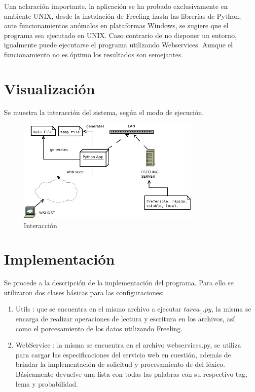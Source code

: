 \documentclass[12pt]{article}
\begin{document}
Una aclaración importante, la aplicación se ha probado exclusivamente en ambiente UNIX, desde la instalación de Freeling hasta las librerías de Python, ante funcionamientos anómalos en plataformas Windows, se sugiere que el programa sea ejecutado en UNIX.
Caso contrario de no disponer un entorno, igualmente puede ejecutarse el programa utilizando Webservices. Aunque el funcionamiento no es óptimo los resultados son semejantes.

\section{Visualización}
Se muestra la interacción del sistema, según el modo de ejecución.

\begin{figure}[!h]
  \centering
    \includegraphics[width=0.8\textwidth]{./fig/arq.png}
  \caption{Interacción}
  \label{fig:arq}
\end{figure} 


\section{Implementación} \label{impl}
Se procede a la descripción de la implementación del programa. Para ello se utilizaron dos clases básicas para las configuraciones:
\begin{enumerate}
   \item Utils : que se encuentra en el mismo archivo a ejecutar $tarea_1.py$, la misma se encarga de realizar operaciones de lectura y escritura en los archivos, así como el porcesamiento de los datos utilizando Freeling.
   \item WebService : la misma se encuentra en el archivo webservices.py, se utiliza para cargar las especificaciones del servicio web en cuestión, además de brindar la implementación de solicitud y procesamiento de del léxico. Básicamente devuelve una lista con todas las palabras con su respectivo tag, lema y probabilidad.
 \end{enumerate} 
\end{document}
